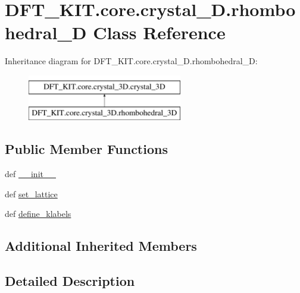 \hypertarget{class_d_f_t___k_i_t_1_1core_1_1crystal__3_d_1_1rhombohedral__3_d}{\section{D\+F\+T\+\_\+\+K\+I\+T.\+core.\+crystal\+\_\+D.\+rhombohedral\+\_\+D Class Reference}
\label{class_d_f_t___k_i_t_1_1core_1_1crystal__3_d_1_1rhombohedral__3_d}
}
Inheritance diagram for D\+F\+T\+\_\+\+K\+I\+T.\+core.\+crystal\+\_\+D.\+rhombohedral\+\_\+D\+:\begin{figure}[H]
\begin{center}
\leavevmode
\includegraphics[height=2.000000cm]{class_d_f_t___k_i_t_1_1core_1_1crystal__3_d_1_1rhombohedral__3_d}
\end{center}
\end{figure}
\subsection*{Public Member Functions}
\begin{DoxyCompactItemize}
\item 
def \hyperlink{class_d_f_t___k_i_t_1_1core_1_1crystal__3_d_1_1rhombohedral__3_d_ad04ca9c76614233152251088a1e1c3b7}{\+\_\+\+\_\+init\+\_\+\+\_\+}
\item 
def \hyperlink{class_d_f_t___k_i_t_1_1core_1_1crystal__3_d_1_1rhombohedral__3_d_a35e7f8c7c0508e7038d0ea6e9e17f78d}{set\+\_\+lattice}
\item 
def \hyperlink{class_d_f_t___k_i_t_1_1core_1_1crystal__3_d_1_1rhombohedral__3_d_ac302290201e57719240d3c3be72589ca}{define\+\_\+klabels}
\end{DoxyCompactItemize}
\subsection*{Additional Inherited Members}


\subsection{Detailed Description}


